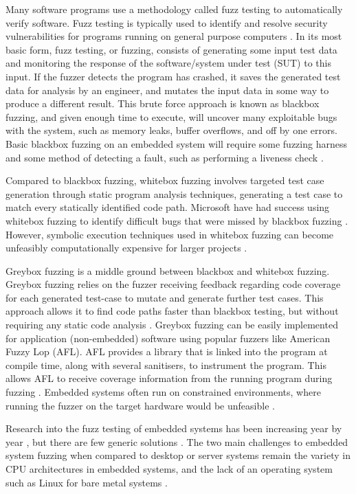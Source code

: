 \documentclass[../report.tex]{subfiles}
\begin{document}
Many software programs use a methodology called fuzz testing to automatically
verify software. Fuzz testing is typically used to identify and resolve
security vulnerabilities for programs running on general purpose computers
\citep{Google_2023}. In its most basic form, fuzz testing, or fuzzing, consists
of generating some input test data and monitoring the response of the
software/system under test (SUT) to this input. If the fuzzer detects the
program has crashed, it saves the generated test data for analysis by an
engineer, and mutates the input data in some way to produce a different result.
This brute force approach is known as blackbox fuzzing, and given enough time
to execute, will uncover many exploitable bugs with the system, such as memory
leaks, buffer overflows, and off by one errors. Basic blackbox fuzzing on an
embedded system will require some fuzzing harness \citep{Eisele_et_al_2022} and
some method of detecting a fault, such as performing a liveness check
\citep{Yun_2022}.

Compared to blackbox fuzzing, whitebox fuzzing involves targeted test case
generation through static program analysis techniques, generating a test case
to match every statically identified code path. Microsoft have had success
using whitebox fuzzing to identify difficult bugs that were missed by
blackbox fuzzing \citep{Godefroid_2012}. However, symbolic execution
techniques used in whitebox fuzzing can become unfeasibly computationally
expensive for larger projects \citep{Krishnamoorthy_2010}.

Greybox fuzzing is a middle ground between blackbox and whitebox fuzzing.
Greybox fuzzing relies on the fuzzer receiving feedback regarding code coverage
for each generated test-case to mutate and generate further test cases. This
approach allows it to find code paths faster than blackbox testing, but without
requiring any static code analysis \citep{Yun_2022}. Greybox fuzzing can be
easily implemented for application (non-embedded) software using popular
fuzzers like American Fuzzy Lop (AFL). AFL provides a library that is linked
into the program at compile time, along with several sanitisers, to instrument
the program. This allows AFL to receive coverage information from the running
program during fuzzing \citep{AFL_2019}. Embedded systems often run on
constrained environments, where running the fuzzer on the target hardware would
be unfeasible \citep{Yun_2022}.

Research into the fuzz testing of embedded systems has been increasing
year by year \citep{Yun_2022}, but there are few generic solutions
\citep{Eisele_et_al_2022}. The two main challenges to embedded system fuzzing
when compared to desktop or server systems remain the variety in CPU
architectures in embedded systems, and the lack of an operating system such as
Linux for bare metal systems \citep{Eisele_et_al_2022}.
\end{document}
